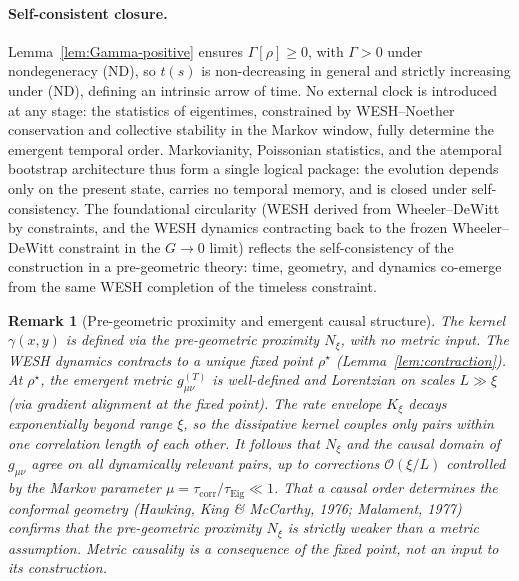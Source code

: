 \documentclass[12pt,a4paper]{article}
\newtheorem{remark}{Remark}[section]
\numberwithin{equation}{section}
\begin{document}
\paragraph{Self-consistent closure.}
Lemma~\ref{lem:Gamma-positive} ensures $\Gamma[\rho]\ge 0$, with $\Gamma>0$ under nondegeneracy (ND), so $t(s)$ is non-decreasing in general and strictly increasing under (ND), defining an intrinsic arrow of time. No external clock is introduced at any stage: the statistics of eigentimes, constrained by WESH--Noether conservation and collective stability in the Markov window, fully determine the emergent temporal order. Markovianity, Poissonian statistics, and the atemporal bootstrap architecture thus form a single logical package: the evolution depends only on the present state, carries no temporal memory, and is closed under self-consistency. The foundational circularity (WESH derived from Wheeler--DeWitt by constraints,
and the WESH dynamics contracting back to the frozen Wheeler--DeWitt constraint
in the $G\!\to\!0$ limit) reflects the self-consistency of the construction
in a pre-geometric theory: time, geometry, and dynamics co-emerge from the same
WESH completion of the timeless constraint.

\begin{remark}[Pre-geometric proximity and emergent causal structure]
\label{rem:proximity-causality}
The kernel $\gamma(x,y)$ is defined via the pre-geometric proximity $N_\xi$, with no metric input. The WESH dynamics contracts to a unique fixed point $\rho^\star$ (Lemma~\ref{lem:contraction}). At $\rho^\star$, the emergent metric $g_{\mu\nu}^{(T)}$ is well-defined and Lorentzian on scales $L\gg\xi$ (via gradient alignment at the fixed point). The rate envelope $K_\xi$ decays exponentially beyond range $\xi$, so the dissipative kernel couples only pairs within one correlation length of each other. It follows that $N_\xi$ and the causal domain of $g_{\mu\nu}$ agree on all dynamically relevant pairs, up to corrections $\mathcal{O}(\xi/L)$ controlled by the Markov parameter $\mu = \tau_{\mathrm{corr}}/\tau_{\mathrm{Eig}}\ll 1$. That a causal order determines the conformal geometry (Hawking, King \& McCarthy, 1976; Malament, 1977) confirms that the pre-geometric proximity $N_\xi$ is strictly weaker than a metric assumption. Metric causality is a consequence of the fixed point, not an input to its construction.
\end{remark}

\vspace{0.5cm}
\end{document}
